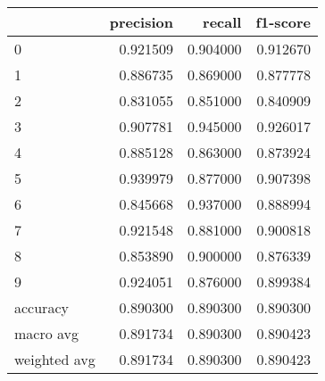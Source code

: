 \begin{tabular}{lrrr}
\toprule
 & precision & recall & f1-score \\
\midrule
0 & 0.921509 & 0.904000 & 0.912670 \\
1 & 0.886735 & 0.869000 & 0.877778 \\
2 & 0.831055 & 0.851000 & 0.840909 \\
3 & 0.907781 & 0.945000 & 0.926017 \\
4 & 0.885128 & 0.863000 & 0.873924 \\
5 & 0.939979 & 0.877000 & 0.907398 \\
6 & 0.845668 & 0.937000 & 0.888994 \\
7 & 0.921548 & 0.881000 & 0.900818 \\
8 & 0.853890 & 0.900000 & 0.876339 \\
9 & 0.924051 & 0.876000 & 0.899384 \\
accuracy & 0.890300 & 0.890300 & 0.890300 \\
macro avg & 0.891734 & 0.890300 & 0.890423 \\
weighted avg & 0.891734 & 0.890300 & 0.890423 \\
\bottomrule
\end{tabular}
